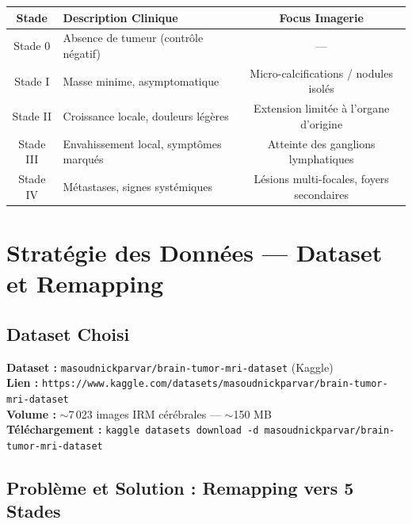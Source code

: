 \documentclass[12pt,a4paper]{article}
\begin{document}
\vspace{0.5cm}
\begin{center}
\begin{tabularx}{\textwidth}{|c|X|c|}
\hline
\rowcolor{primaryBlue!20}
\textbf{Stade} & \textbf{Description Clinique} & \textbf{Focus Imagerie} \\
\hline
Stade 0  & Absence de tumeur (contrôle négatif) & — \\
\hline
Stade I  & Masse minime, asymptomatique & Micro-calcifications / nodules isolés \\
\hline
Stade II & Croissance locale, douleurs légères & Extension limitée à l'organe d'origine \\
\hline
Stade III & Envahissement local, symptômes marqués & Atteinte des ganglions lymphatiques \\
\hline
Stade IV & Métastases, signes systémiques & Lésions multi-focales, foyers secondaires \\
\hline
\end{tabularx}
\end{center}

\section{Stratégie des Données — Dataset et Remapping}

\subsection*{Dataset Choisi}

\begin{alertbox}
\textbf{Dataset :} \texttt{masoudnickparvar/brain-tumor-mri-dataset} (Kaggle) \\
\textbf{Lien :} \texttt{https://www.kaggle.com/datasets/masoudnickparvar/brain-tumor-mri-dataset} \\
\textbf{Volume :} $\sim$7\,023 images IRM cérébrales — $\sim$150 MB \\
\textbf{Téléchargement :} \texttt{kaggle datasets download -d masoudnickparvar/brain-tumor-mri-dataset}
\end{alertbox}

\vspace{0.4cm}

\subsection*{Problème et Solution : Remapping vers 5 Stades}
\end{document}
